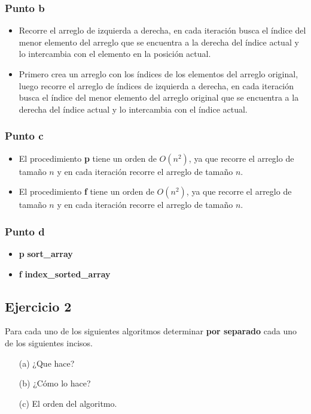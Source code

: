 \subsubsection{Punto b}
\begin{itemize}
    \item Recorre el arreglo de izquierda a derecha, en cada iteración busca el índice del menor elemento del arreglo que se encuentra a la derecha del índice actual y lo intercambia con el elemento en la posición actual.
    \item Primero crea un arreglo con los índices de los elementos del arreglo original, luego recorre el arreglo de índices de izquierda a derecha, en cada iteración busca el índice del menor elemento del arreglo original que se encuentra a la derecha del índice actual y lo intercambia con el índice actual.
\end{itemize}

\subsubsection{Punto c}
\begin{itemize}
    \item El procedimiento \textbf{p} tiene un orden de $O(n^2)$, ya que recorre el arreglo de tamaño $n$ y en cada iteración recorre el arreglo de tamaño $n$.
    \item El procedimiento \textbf{f} tiene un orden de $O(n^2)$, ya que recorre el arreglo de tamaño $n$ y en cada iteración recorre el arreglo de tamaño $n$.
\end{itemize}

\subsubsection{Punto d}
\begin{itemize}
    \item \textbf{p} \textbf{sort\_array}
    \item \textbf{f} \textbf{index\_sorted\_array}
\end{itemize}

\subsection{Ejercicio 2}
Para cada uno de los siguientes algoritmos determinar \textbf{por separado} cada uno de los siguientes incisos.
\begin{itemize}
    \item[(a)] ¿Que hace?
    \item[(b)] ¿Cómo lo hace?
    \item[(c)] El orden del algoritmo.
\end{itemize}

